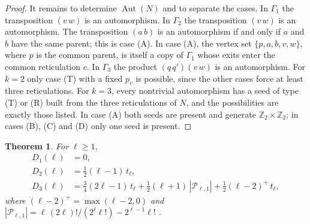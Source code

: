 \documentclass[11pt,a4paper]{article}
\newtheorem{theorem}{Theorem}[section]
\theoremstyle{definition}
\newcommand{\Aut}{\operatorname{Aut}}
\newcommand{\cP}{\mathcal{P}}
\begin{document}
\begin{proof}
It remains to determine $\Aut(N)$ and to separate the cases. In $\Gamma_1$ the transposition $(v\,w)$ is an automorphism. In $\Gamma_2$ the transposition $(v\,w)$ is an automorphism. The transposition $(a\,b)$ is an automorphism if and only if $a$ and $b$ have the same parent; this is case (A). In case (A), the vertex set $\{p,a,b,v,w\}$, where $p$ is the common parent, is itself a copy of $\Gamma_1$ whose exits enter the common reticulation $c$. In $\Gamma_3$ the product $(q\,q')(v\,w)$ is an automorphism. For $k=2$ only case (T) with a fixed $p_v$ is possible, since the other cases force at least three reticulations. For $k=3$, every nontrivial automorphism has a seed of type (T) or (R) built from the three reticulations of $N$, and the possibilities are exactly those listed. In case (A) both seeds are present and generate $\mathbb{Z}_2\times\mathbb{Z}_2$; in cases (B), (C) and (D) only one seed is present.
\end{proof}


\begin{theorem}\label{thm:defects}
For $\ell\ge1$,
\begin{align}
D_1(\ell)&=0,\label{eq:D1}\\
D_2(\ell)&=\tfrac12(\ell-1)\,t_\ell,\label{eq:D2}\\
D_3(\ell)&=\tfrac34(2\ell-1)\,t_\ell+\tfrac12(\ell+1)\,|\cP_{\ell,1}|+\tfrac12(\ell-2)^{+}\,t_\ell,\label{eq:D3}
\end{align}
where $(\ell-2)^+=\max(\ell-2,0)$ and $|\cP_{\ell,1}|=\ell\,(2\ell)!/(2^\ell\ell!)-2^{\ell-1}\ell!$ \cite{Zhang19}.
\end{theorem}
\end{document}
